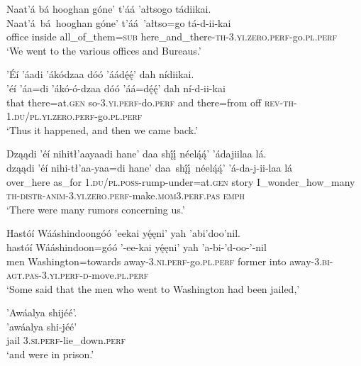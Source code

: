 \ea\label{ex:text7-12-3}
Naat’á bá hooghan góne’ t’áá ’ałtsogo tádiikai.\\
\gll Naat’á~bá~{hooghan}	góne’	t’áá~{’ałtso=go}	tá-d-ii-kai\\
     office	inside	all\_of\_them=\textsc{sub}	here\_and\_there-\textsc{th}-3.\textsc{yi}.\textsc{zero}.\textsc{perf}-go.\textsc{pl}.\textsc{perf}\\
\glt `We went to the various offices and Bureaus.'
\z

\ea\label{ex:text7-12-4}
’Éí ’áadi ’ákódzaa dóó ’áádę́ę́’ dah nídiikai.\\
\gll ’éí	’áa=di	’ákó-ó-dzaa	dóó	’áá=dę́ę́’	dah	ní-d-ii-kai\\
     that	there=at.\textsc{gen}	so-3.\textsc{yi}.\textsc{perf}-do.\textsc{perf}	and	there=from	off	\textsc{rev}-\textsc{th}-1.\textsc{du}/\textsc{pl}.\textsc{yi}.\textsc{zero}.\textsc{perf}-go.\textsc{pl}.\textsc{perf}\\
\glt `Thus it happened, and then we came back.'
\z

\ea\label{ex:text7-13-1}
Dząądi ’éí nihitł’aayaadi hane’ daa shį́į́ néelą́ą́’ ’ádajiilaa lá.\\
\gll dząądi	’éí	nihi-tł’aa-yaa=di	hane’	daa~shį́į́~{néelą́ą́’}	’á-da-j-ii-laa	lá\\
     over\_here	as\_for	1.\textsc{du}/\textsc{pl}.\textsc{poss}-rump-under=at.\textsc{gen}	story	I\_wonder\_how\_many	\textsc{th}-\textsc{distr}-\textsc{anim}-3.\textsc{yi}.\textsc{zero}.\textsc{perf}-make.\textsc{mom}3.\textsc{perf}.\textsc{pas}	\textsc{emph}\\
\glt `There were many rumors concerning us.'
\z

\ea\label{ex:text7-13-2}
Hastóí Wááshindoongóó ’eekai yę́ęni’ yah ’abi’doo’nil.\\
\gll hastóí	Wááshindoon=góó	’-ee-kai	yę́ęni’	yah	’a-bi-’d-oo-’-nil\\
     men	Washington=towards	away-3.\textsc{ni}.\textsc{perf}-go.\textsc{pl}.\textsc{perf}	former	into	away-3.\textsc{bi}-\textsc{agt}.\textsc{pas}-3.\textsc{yi}.\textsc{perf}-\textsc{d}-move.\textsc{pl}.\textsc{perf}\\
\glt `Some said that the men who went to Washington had been jailed,'
\z

\ea\label{ex:text7-13-3}
’Awáalya shijéé’.\\
\gll ’awáalya	shi-jéé’\\
     jail	3.\textsc{si}.\textsc{perf}-lie\_down.\textsc{perf}\\
\glt `and were in prison.'
\z

